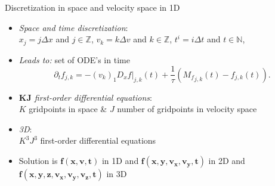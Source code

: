 \documentclass[usenames,dvipsnames,Nike,mathserif]{tuberlinbeamer}
\begin{document}
\begin{frame}[fragile]{Discretization in space and velocity space in 1D}
	\begin{itemize}
		\item<1-> \emph{Space and time discretization}:\\
		 $x_j = j\Delta x$ and $j\in \mathbb{Z}$, $v_k = k\Delta v$ and $k\in \mathbb{Z}$, $t^i=i\Delta t$ and $t\in \mathbb{N}$,
		\item<2-> \emph{Leads to:} set of ODE's in time 
			\begin{equation}
			\partial_t f_{j,k} = -(v_k)_1D_x f|_{j,k}(t) + \frac{1}{\tau}({M_f}_{j,k}(t) - f_{j,k}(t))\mathrm{.}
			\end{equation}
		\item<3-> \emph{$\mathbf{KJ}$ first-order differential equations}:\\
		$K$ gridpoints in space \& $J$ number of gridpoints in velocity space
		\item<4-> \emph{3D}:\\ $K^3J^3$ first-order differential equations
		\item<5-> Solution is $\mathbf{f(x,v,t)}$ in 1D and $\mathbf{f(x,y,v_x,v_y,t)}$ in 2D and $\mathbf{f(x,y,z,v_x,v_y,v_z,t)}$ in 3D 
	\end{itemize}
\end{frame}
\end{document}
